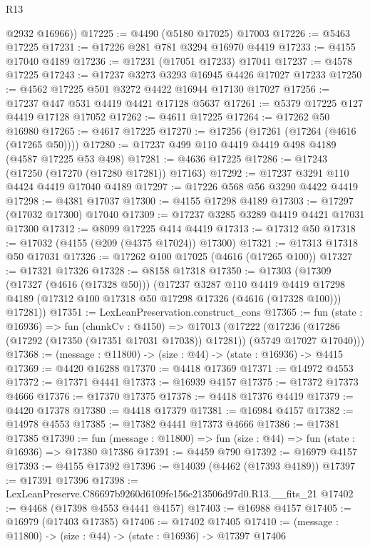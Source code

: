 \begin{lexlean}{R13}
\begin{coremodule}
        @2932
        @16966))
@17225 := @4490 (@5180 @17025) @17003
@17226 := @5463 @17225
@17231 := @17226 @281 @781 @3294 @16970 @4419
@17233 := @4155 @17040 @4189
@17236 := @17231 (@17051 @17233) @17041
@17237 := @4578 @17225
@17243 := @17237 @3273 @3293 @16945 @4426 @17027 @17233
@17250 := @4562 @17225 @501 @3272 @4422 @16944 @17130 @17027
@17256 := @17237 @447 @531 @4419 @4421 @17128 @5637
@17261 := @5379 @17225 @127 @4419 @17128 @17052
@17262 := @4611 @17225
@17264 := @17262 @50 @16980
@17265 := @4617 @17225
@17270 := @17256 (@17261 (@17264 (@4616 (@17265 @50))))
@17280 := @17237 @499 @110 @4419 @4419 @498 @4189 (@4587 @17225 @53 @498)
@17281 := @4636 @17225
@17286 := @17243 (@17250 (@17270 (@17280 @17281)) @17163)
@17292 := @17237 @3291 @110 @4424 @4419 @17040 @4189
@17297 := @17226 @568 @56 @3290 @4422 @4419
@17298 := @4381 @17037
@17300 := @4155 @17298 @4189
@17303 := @17297 (@17032 @17300) @17040
@17309 := @17237 @3285 @3289 @4419 @4421 @17031 @17300
@17312 := @8099 @17225 @414 @4419
@17313 := @17312 @50
@17318 := @17032 (@4155 (@209 (@4375 @17024)) @17300)
@17321 := @17313 @17318 @50 @17031
@17326 := @17262 @100 @17025 (@4616 (@17265 @100))
@17327 := @17321 @17326
@17328 := @8158 @17318
@17350 := @17303
    (@17309
      (@17327 (@4616 (@17328 @50)))
      (@17237
        @3287
        @110
        @4419
        @4419
        @17298
        @4189
        (@17312 @100 @17318 @50 @17298 @17326 (@4616 (@17328 @100)))
        @17281))
@17351 := LexLeanPreservation.construct_cons
@17365 := fun (state : @16936) =>
  fun (chunkCv : @4150) =>
  @17013
    (@17222 (@17236 (@17286 (@17292 (@17350 (@17351 @17031 @17038)) @17281)) (@5749 @17027 @17040)))
@17368 := (message : @11800) -> (size : @44) -> (state : @16936) -> @4415
@17369 := @4420 @16288
@17370 := @4418 @17369
@17371 := @14972 @4553
@17372 := @17371 @4441
@17373 := @16939 @4157
@17375 := @17372 @17373 @4666
@17376 := @17370 @17375
@17378 := @4418 @17376 @4419
@17379 := @4420 @17378
@17380 := @4418 @17379
@17381 := @16984 @4157
@17382 := @14978 @4553
@17385 := @17382 @4441 @17373 @4666
@17386 := @17381 @17385
@17390 := fun (message : @11800) => fun (size : @44) => fun (state : @16936) => @17380 @17386
@17391 := @4459 @790
@17392 := @16979 @4157
@17393 := @4155 @17392
@17396 := @14039 (@4462 (@17393 @4189))
@17397 := @17391 @17396
@17398 := LexLeanPreserve.C86697b9260d6109fe156e213506d97d0.R13.__fits_21
@17402 := @4468 (@17398 @4553 @4441 @4157)
@17403 := @16988 @4157
@17405 := @16979 (@17403 @17385)
@17406 := @17402 @17405
@17410 := (message : @11800) -> (size : @44) -> (state : @16936) -> @17397 @17406

\end{coremodule}
\end{lexlean}

